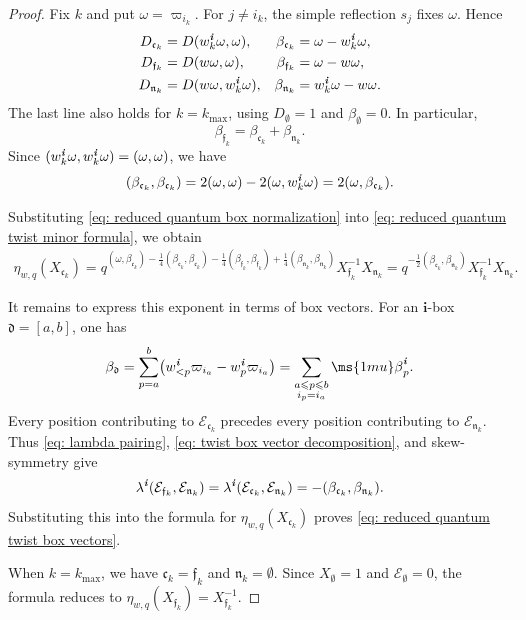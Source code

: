 \documentclass[12pt, leqno]{amsart}
\numberwithin{equation}{section}
\theoremstyle{plain}
\theoremstyle{definition}
\renewcommand{\le}{\leqslant}
\newcommand{\be}{{\ms{1mu}\beta}}
\newcommand{\ii}{ \textbf{\textit{i}}}
\newcommand{\frakc}{\mathfrak{c}}
\newcommand{\frakd}{\mathfrak{d}}
\newcommand{\frakf}{\mathfrak{f}}
\newcommand{\frakn}{\mathfrak{n}}
\newcommand{\bfi}{\mathbf{i}}
\newcommand{\calE}{\mathcal{E}}
\begin{document}
\begin{proof}
Fix $k$ and put $\omega=\varpi_{i_k}$.
For $j\ne i_k$, the simple reflection $s_j$ fixes $\omega$.
Hence
\begin{align*}
 D_{\frakc_k}&=D(w_k^\ii\omega,\omega),&
 \beta_{\frakc_k}&=\omega-w_k^\ii\omega,\allowdisplaybreaks\\
 D_{\frakf_k}&=D(w\omega,\omega),&
 \beta_{\frakf_k}&=\omega-w\omega,\allowdisplaybreaks\\
 D_{\frakn_k}&=D(w\omega,w_k^\ii\omega),&
 \beta_{\frakn_k}&=w_k^\ii\omega-w\omega.
\end{align*}
The last line also holds for $k=k_{\max}$, using
$D_\emptyset=1$ and $\beta_\emptyset=0$.
In particular,
\[
 \beta_{\frakf_k}
 =
 \beta_{\frakc_k}+\beta_{\frakn_k}.
\]
Since $(w_k^\ii\omega,w_k^\ii\omega)=(\omega,\omega)$, we have
\[
 (\beta_{\frakc_k},\beta_{\frakc_k})
 =2(\omega,\omega)-2(\omega,w_k^\ii\omega)
 =2(\omega,\beta_{\frakc_k}).
\]

Substituting \eqref{eq: reduced quantum box normalization}
into \eqref{eq: reduced quantum twist minor formula},
we obtain
\begin{align*}
 \eta_{w,q}(X_{\frakc_k})
 =
 q^{(\omega,\beta_{\frakc_k})
 -\frac14(\beta_{\frakc_k},\beta_{\frakc_k})
 -\frac14(\beta_{\frakf_k},\beta_{\frakf_k})
 +\frac14(\beta_{\frakn_k},\beta_{\frakn_k})}
 X_{\frakf_k}^{-1}X_{\frakn_k}
 =
 q^{-\frac12(\beta_{\frakc_k},\beta_{\frakn_k})}
 X_{\frakf_k}^{-1}X_{\frakn_k}.
\end{align*}

It remains to express this exponent in terms of box vectors.
For an $\bfi$-box $\frakd=[a,b]$, one has
\[
 \beta_{\frakd}  =  \sum_{p=a}^{b}
 \bigl(w_{<p}^\ii\varpi_{i_a}-w_p^\ii\varpi_{i_a}\bigr)
 =  \sum_{\substack{a\le p\le b\\i_p=i_a}}\be_p^\ii.
\]
Every position contributing to $\calE_{\frakc_k}$ precedes
every position contributing to $\calE_{\frakn_k}$.
Thus \eqref{eq: lambda pairing},
\eqref{eq: twist box vector decomposition}, and skew-symmetry give
\begin{align*}
 \lambda^\ii(\calE_{\frakf_k},\calE_{\frakn_k})
 =  \lambda^\ii(\calE_{\frakc_k},\calE_{\frakn_k}) 
 =  -(\beta_{\frakc_k},\beta_{\frakn_k}).
\end{align*}
Substituting this into the formula for
$\eta_{w,q}(X_{\frakc_k})$ proves
\eqref{eq: reduced quantum twist box vectors}.

When $k=k_{\max}$, we have
$\frakc_k=\frakf_k$ and $\frakn_k=\emptyset$.
Since $X_\emptyset=1$ and $\calE_\emptyset=0$, the formula
reduces to
$\eta_{w,q}(X_{\frakf_k})=X_{\frakf_k}^{-1}$.
\end{proof}
\end{document}
